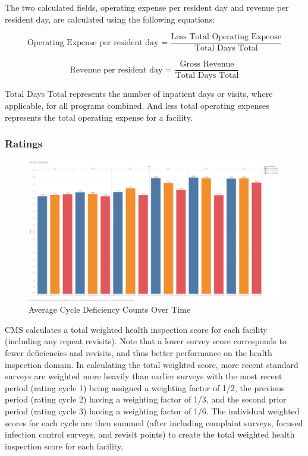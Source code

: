 \documentclass{article}
\theoremstyle{mytheoremstyle}
\theoremstyle{mytheoremstyle}
\theoremstyle{myproblemstyle}
\begin{document}
\noindent The two calculated fields, operating expense per resident day and revenue per resident day, are calculated using the following equations:

\[\text{Operating Expense per resident day = }\frac{\text{Less Total Operating Expense}}{\text{Total Days Total}}\]

\[\text{Revenue per resident day = }\frac{\text{Gross Revenue}}{\text{Total Days Total}}\]

\noindent Total Days Total represents the number of inpatient days or visits, where applicable, for all programs combined. And less total operating expenses represents the total operating expense for a facility.

\pagebreak


\subsubsection{Ratings}

\begin{figure}[htbp]
\centering
\includegraphics[width=0.8\linewidth]{Images/COVID Cycle Defs.png}
\caption{Average Cycle Deficiency Counts Over Time}
\label{defs over time}
\end{figure}

CMS calculates a total weighted health inspection score for each facility (including any repeat revisits). Note that a lower survey score corresponds to fewer deficiencies and revisits, and thus better performance on the health inspection domain. In calculating the total weighted score, more recent standard surveys are weighted more heavily than earlier surveys with the most recent period (rating cycle 1) being assigned a weighting factor of 1/2, the previous period (rating cycle 2) having a weighting factor of 1/3, and the second prior period (rating cycle 3) having a weighting factor of 1/6. The individual weighted scores for each cycle are then summed (after including complaint surveys, focused infection control surveys, and revisit points) to create the total weighted health inspection score for each facility. 
\end{document}
